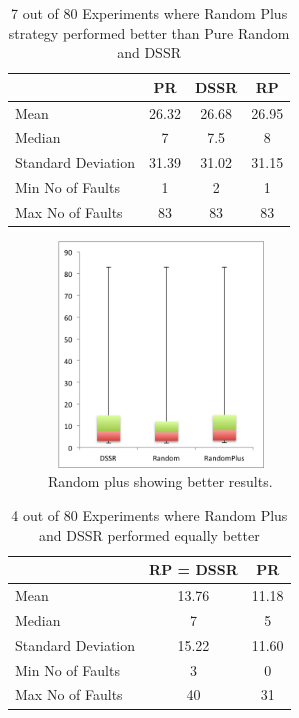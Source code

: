 \documentclass[conference]{IEEEtran}
\begin{document}

\begin{table}[H]
\caption{7 out of 80 Experiments where Random Plus strategy performed better than Pure Random and DSSR}
\centering
\begin{tabular}{|l|c|c|c|}
\hline\hline
 				& PR			&  DSSR 			& RP \\[1ex]
\hline
Mean  			&    26.32		&  26.68			&  26.95\\
Median 			&    7 		&  7.5 			&  8 \\
Standard Deviation 	&    31.39		&  31.02			&  31.15\\
Min No of Faults	&    1			&  2				&  1\\
Max No of Faults 	&    83		&  83				&  83\\
\hline
\end{tabular}
\label{table:result3}
\end{table}


\begin{figure}[ht]
\centering
\includegraphics[width=6cm,height=6cm]{RandomPlusBetter.png}
\caption{Random plus showing better results.}
\label{fig:Result1}
\end{figure}



\begin{table}[H]
\caption{4 out of 80 Experiments where Random Plus and DSSR performed equally better}
\centering
\begin{tabular}{|l|c|c|}
\hline\hline
 				& RP = DSSR			&  PR \\[1ex]
\hline
Mean  			&    13.76				&  11.18\\
Median 			&    7 				&  5\\
Standard Deviation 	&    15.22				&  11.60\\
Min No of Faults	&    3					&  0\\
Max No of Faults 	&    40				&  31\\
\hline
\end{tabular}
\label{table:result4}
\end{table}
\end{document}
